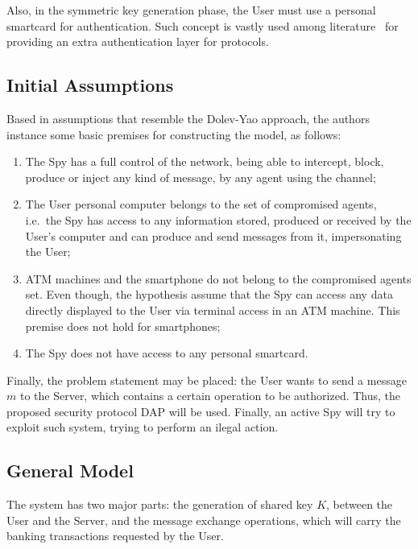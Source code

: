 Also, in the symmetric key generation phase, the User must use a personal smartcard for authentication. Such concept is vastly used among literature~\cite{ShoupRubin96} for providing an extra authentication layer for protocols.



\subsection{Initial Assumptions}
Based in assumptions that resemble the Dolev-Yao approach, the authors instance some basic premises for constructing the model, as follows:

\begin{enumerate}
  \item The Spy has a full control of the network, being able to intercept, block, produce or inject any kind of message, by any agent using the channel;

  \item The User personal computer belongs to the set of compromised agents, i.e.\ the Spy has access to any information stored, produced or received by the User's computer and can produce and send messages from it, impersonating the User;

  \item ATM machines and the smartphone do not belong to the compromised agents set. Even though, the hypothesis assume that the Spy can access any data directly displayed to the User via terminal access in an ATM machine. This premise does not hold for smartphones;

  \item The Spy does not have access to any personal smartcard.
\end{enumerate}

Finally, the problem statement may be placed: the User wants to send a message \(m\) to the Server, which contains a certain operation to be authorized. Thus, the proposed security protocol DAP will be used. Finally, an active Spy will try to exploit such system, trying to perform an ilegal action.



\subsection{General Model}
The system has two major parts: the generation of shared key \(K\), between the User and the Server, and the message exchange operations, which will carry the banking transactions requested by the User.

